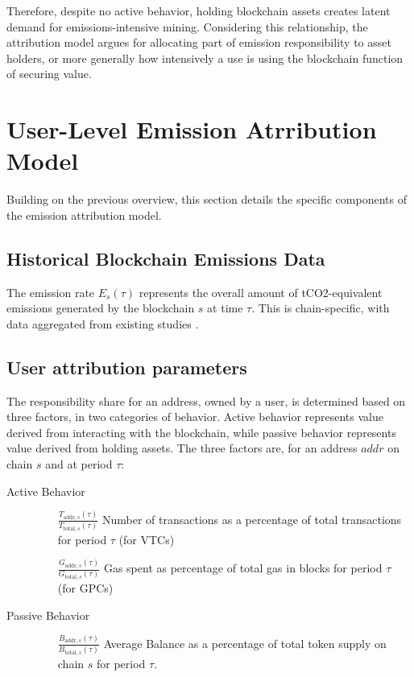 \documentclass[11pt]{report}
\begin{document}
Therefore, despite no active behavior, holding blockchain assets creates latent demand for emissions-intensive mining. Considering this relationship, the attribution model argues for allocating part of emission responsibility to asset holders, or more generally how intensively a use is using the blockchain function of securing value. 

\section{User-Level Emission Atrribution Model}

Building on the previous overview, this section details the specific components of the emission attribution model.

\subsection{Historical Blockchain Emissions Data}

The emission rate \(E_s(\tau)\) represents the overall amount of tCO2-equivalent emissions generated by the blockchain $s$ at time $\tau$. This is chain-specific, with data aggregated from existing studies \cite{neumuellerCambridgeBitcoinElectricity2021,stollCarbonFootprintBitcoin2019}. 


\subsection{User attribution parameters}

The responsibility share for an address, owned by a user, is determined based on three factors, in two categories of behavior. Active behavior represents value derived from interacting with the blockchain, while passive behavior represents value derived from holding assets. The three factors are, for an address $addr$ on chain $s$ and at period $\tau$:

\begin{samepage}
\begin{description}
    \item[Active Behavior] \hfill
    \begin{itemize}
        \item[\( \frac{T_{\text{addr}, s}(\tau)}{T_{\text{total},s}(\tau)} \)] Number of transactions as a percentage of total transactions for period $\tau$ (for VTCs)
        \item[\( \frac{G_{\text{addr},s}(\tau)}{G_{\text{total},s}(\tau)} \)] Gas spent as percentage of total gas in blocks for period $\tau$ (for GPCs)
    \end{itemize}
    \item[Passive Behavior] \hfill
    \begin{itemize}
        \item[\( \frac{B_{\text{addr},s}(\tau)}{B_{\text{total},s}(\tau)} \)] Average Balance as a percentage of total token supply on chain $s$ for period $\tau$.
    \end{itemize}
\end{description}
\end{samepage}
\end{document}
